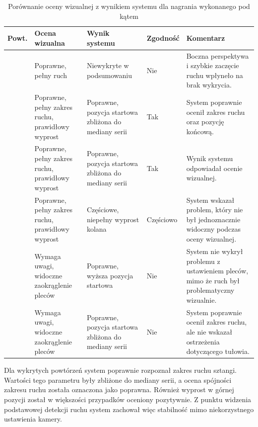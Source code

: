 \begin{table}[H]
\centering
\caption{Porównanie oceny wizualnej z wynikiem systemu dla nagrania wykonanego pod kątem}
\label{tab:porownanie-nagranie-pod-katem}
\footnotesize
\renewcommand{\arraystretch}{1.08}
\setlength{\tabcolsep}{2.5pt}
\begin{tabular}{|
>{\centering\arraybackslash}p{1.0cm}|
>{\raggedright\arraybackslash}p{3.7cm}|
>{\raggedright\arraybackslash}p{3.8cm}|
>{\centering\arraybackslash}p{1.6cm}|
>{\raggedright\arraybackslash}p{4.0cm}|}
\hline
\textbf{Powt.} & \textbf{Ocena wizualna} & \textbf{Wynik systemu} & \textbf{Zgodność} & \textbf{Komentarz} \\ \hline
1 & Poprawne, pełny ruch & Niewykryte w podsumowaniu & Nie & Boczna perspektywa i szybkie zaczęcie ruchu wpłyneło na brak wykrycia. \\ \hline
2 & Poprawne, pełny zakres ruchu, prawidłowy wyprost & Poprawne, pozycja startowa zbliżona do mediany serii & Tak & System poprawnie ocenił zakres ruchu oraz pozycję końcową. \\ \hline
3 & Poprawne, pełny zakres ruchu, prawidłowy wyprost & Poprawne, pozycja startowa zbliżona do mediany serii & Tak & Wynik systemu odpowiadał ocenie wizualnej. \\ \hline
4 & Poprawne, pełny zakres ruchu, prawidłowy wyprost & Częściowe, niepełny wyprost kolana & Częściowo & System wskazał problem, który nie był jednoznacznie widoczny podczas oceny wizualnej. \\ \hline
5 & Wymaga uwagi, widoczne zaokrąglenie pleców & Poprawne, wyższa pozycja startowa & Nie & System nie wykrył problemu z ustawieniem pleców, mimo że ruch był problematyczny wizualnie. \\ \hline
6 & Wymaga uwagi, widoczne zaokrąglenie pleców & Poprawne, pozycja startowa zbliżona do mediany serii & Nie & System poprawnie ocenił zakres ruchu, ale nie wskazał ostrzeżenia dotyczącego tułowia. \\ \hline
\end{tabular}
\end{table}

Dla wykrytych powtórzeń system poprawnie rozpoznał zakres ruchu sztangi. Wartości tego parametru były zbliżone do mediany serii, a ocena spójności zakresu ruchu została oznaczona jako poprawna. Również wyprost w górnej pozycji został w większości przypadków oceniony pozytywnie. Z punktu widzenia podstawowej detekcji ruchu system zachował więc stabilność mimo niekorzystnego ustawienia kamery.

